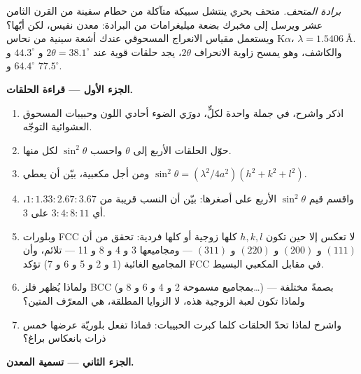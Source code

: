 \begin{problem}\label{pb:b3:crystalline-solids:1}
\emph{برادة المتحف.} متحف بحري ينتشل سبيكة متآكلة
من حطام سفينة من القرن الثامن عشر ويرسل إلى مخبرك
بضعة ميليغرامات من البرادة: معدن نفيس، لكن أيّها؟ ويستعمل مقياس
الانعراج المسحوقي عندك أشعة سينية من نحاس K$\alpha$،
$\lambda = \qty{1.5406}{\angstrom}$. والكاشف، وهو يمسح زاوية
الانحراف $2\theta$، يجد حلقات قوية عند $2\theta =
38.1^\circ$ و $44.3^\circ$ و $64.4^\circ$ و $77.5^\circ$.

\medskip\noindent\textbf{الجزء الأول --- قراءة الحلقات.}

\begin{enumerate}
  \item اذكر  واشرح، في جملة واحدة لكلٍّ، دورَي
        الضوء أحادي اللون وحبيبات المسحوق العشوائية
        التوجّه.
  \item حوّل الحلقات الأربع إلى $\theta$ واحسب
        $\sin^2\theta$ لكل منها.
  \item ومن أجل  مكعبية، بيّن أن  يعطي
        $\sin^2\theta = (\lambda^2/4a^2)(h^2 + k^2 + l^2)$.
  \item واقسم قيم $\sin^2\theta$ الأربع على أصغرها:
        بيّن أن النسب قريبة من $1 : 1.33 : 2.67 : 3.67$،
        أي $3 : 4 : 8 : 11$ على 3.
  \item وبلورات FCC لا تعكس إلا حين تكون $h, k, l$ كلها زوجية أو
        كلها فردية: تحقق من أن $(111)$ و $(200)$ و $(220)$ و $(311)$ ---
        ومجاميعها 3 و 4 و 8 و 11 --- تلائم، وأن المجاميع الغائبة
        (1 و 2 و 5 و 6 و 7) تؤكد FCC في مقابل المكعبي البسيط.
  \item ولماذا يُظهر فلز BCC (بمجاميع مسموحة 2 و 4 و 6 و 8 و\dots)
        بصمةً مختلفة --- ولماذا تكون لعبة الزوجية هذه، لا
        الزوايا المطلقة، هي المعرّف المتين؟
  \item واشرح لماذا تحدّ الحلقات كلما كبرت الحبيبات: فماذا تفعل
        بلوريّة عرضها خمس ذرات بانعكاس براغ؟
\end{enumerate}

\medskip\noindent\textbf{الجزء الثاني --- تسمية المعدن.}


\end{problem}
